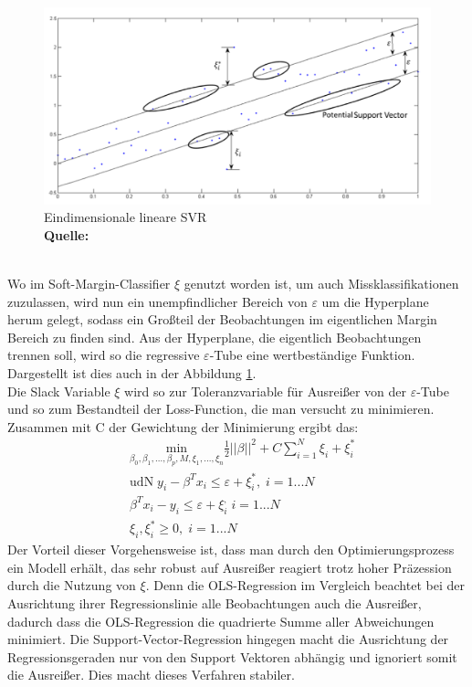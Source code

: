 \documentclass[a4paper,12pt]{thesis}
\newcommand*{\captionsource}[2]{%
	\caption[{#1}]{%
		#1%
		\\\hspace{\linewidth}%
		\textbf{Quelle:} #2%
	}%
}
\begin{document}
\begin{figure}[!ht]
	\centering
	\includegraphics[width=\textwidth]{Plots/SVM3.png}
	\captionsource{Eindimensionale lineare SVR}{
		\cite{Awad2015}
	}
	\label{SVM3}
\end{figure}\\
Wo im Soft-Margin-Classifier $\xi$ genutzt worden ist, um auch Missklassifikationen zuzulassen, wird nun ein unempfindlicher Bereich von $\varepsilon$ um die Hyperplane herum gelegt, sodass ein Großteil der Beobachtungen im eigentlichen Margin Bereich zu finden sind. Aus der Hyperplane, die eigentlich Beobachtungen trennen soll, wird so die regressive $\varepsilon$-Tube eine wertbeständige Funktion. Dargestellt ist dies auch in der Abbildung \ref{SVM3}.\\
Die Slack Variable $\xi$ wird so zur Toleranzvariable für Ausreißer von der $\varepsilon$-Tube und so zum Bestandteil der Loss-Function, die man versucht zu minimieren. Zusammen mit C der Gewichtung der Minimierung ergibt das:
\begin{equation}
	\label{SVM:Regression}
	\begin{aligned}
		&\underset{\beta_0, \beta_1, ... , \beta_p,M,\xi_1,...,\xi_n}{\text{min}}\frac{1}{2}||\beta||^2 + C\sum_{i=1}^N \xi_i + \xi_i^*\\
		&\text{udN}\; y_i - \beta^T x_i \leq \varepsilon + \xi_i^*, \; i=1...N\\
		&\beta^T x_i - y_i \leq \varepsilon + \xi_i^, \; i=1...N\\
		&\xi_i, \xi_i^* \geq 0, \; i=1...N
	\end{aligned} 
\end{equation}
Der Vorteil dieser Vorgehensweise ist, dass man durch den Optimierungsprozess ein Modell erhält, das sehr robust auf Ausreißer reagiert trotz hoher Präzession durch die Nutzung von $\xi$. Denn die OLS-Regression im Vergleich beachtet bei der Ausrichtung ihrer Regressionslinie alle Beobachtungen auch die Ausreißer, dadurch dass die OLS-Regression die quadrierte Summe aller Abweichungen minimiert. Die Support-Vector-Regression hingegen macht die Ausrichtung der Regressionsgeraden nur von den Support Vektoren abhängig und ignoriert somit die Ausreißer. Dies macht dieses Verfahren stabiler.
\end{document}
